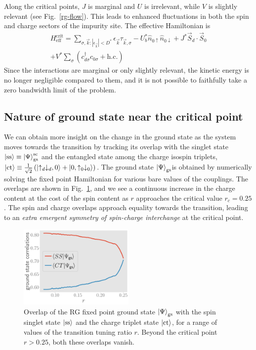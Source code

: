 \documentclass[reprint,superscriptaddress,floatfix]{revtex4-2}
\begin{document}
Along the critical points, \(J\) is marginal and \(U\) is irrelevant, while \(V\) is slightly relevant (see Fig.~\ref{rg-flow}). This leads to enhanced fluctuations in both the spin and charge sectors of the impurity site. The effective Hamiltonian is
\begin{equation}\begin{aligned}
	H_\text{eff}^\text{crit} = \sum_{\sigma,\vec k:|\epsilon_{\vec k}| < D^*} \epsilon_{\vec k} \tau_{\vec k,\sigma} - U_b^* \hat n_{0 \uparrow} \hat n_{0 \downarrow} + J^* \vec{S}_d\cdot\vec{S}_0\\
	+ V^*\sum_\sigma \left( c^\dagger_{d\sigma}c_{0\sigma} + \text{h.c.}\right) 
\end{aligned}\end{equation}
Since the interactions are marginal or only slightly relevant, the kinetic energy is no longer negligible compared to them, and it is not possible to faithfully take a zero bandwidth limit of the problem. 
\subsection{Nature of ground state near the critical point}

We can obtain more insight on the change in the ground state as the system moves towards the transition by tracking its overlap with the singlet state \(\ket{\text{ss}} \equiv \ket{\Psi}_\text{gs}^\text{sc}\) and the entangled state among the charge isospin triplets, \(\ket{\text{ct}} \equiv \frac{1}{\sqrt 2}\left(\ket{\uparrow_d \downarrow_d,0} + \ket{0,\uparrow_0 \downarrow_0}\right)\). The ground state \(\ket{\Psi}_\text{gs}\)is obtained by numerically solving the fixed point Hamiltonian for various bare values of the couplings. The overlaps are shown in Fig.~\ref{overlaps}, and we see a continuous increase in the charge content at the cost of the spin content as \(r\) approaches the critical value \(r_c = 0.25\). The spin and charge overlaps approach equality towards the transition, leading to an {\it extra emergent symmetry of spin-charge interchange} at the critical point.

\begin{figure}[htpb]
	\centering
\includegraphics[width=0.5\textwidth]{../figures/corrs_gs.pdf}
\caption{Overlap of the RG fixed point ground state \(\ket{\Psi}_\text{gs}\) with the spin singlet state \(\ket{\text{ss}}\) and the charge triplet state \(\ket{\text{ct}}\), for a range of values of the transition tuning ratio \(r\). Beyond the critical point \(r > 0.25\), both these overlaps vanish.}
	\label{overlaps}
\end{figure}
\end{document}
